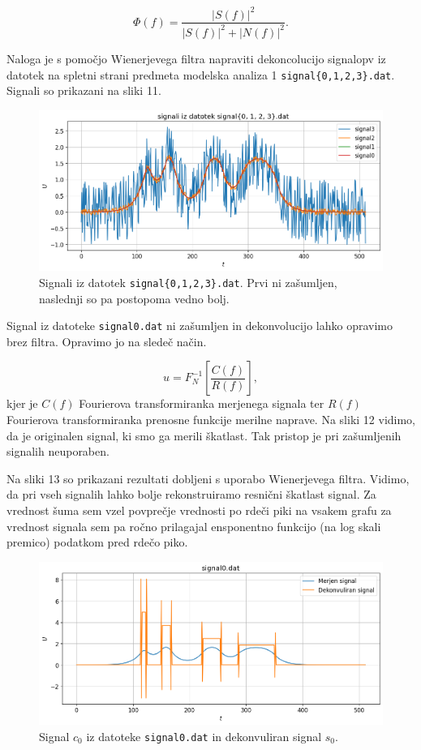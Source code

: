 \documentclass[slovene,11pt,a4paper]{article}
\begin{document}
\begin{equation}
\Phi (f) = \frac{|S(f)|^2}{|S(f)|^2+|N(f)|^2}.
\end{equation}

Naloga je s pomočjo Wienerjevega filtra napraviti dekoncolucijo signalopv iz datotek na spletni strani predmeta modelska analiza 1 \texttt{signal\{0,1,2,3\}.dat}. Signali so prikazani na sliki 11.

\begin{figure}[h!]
\centering
\includegraphics[width=12cm]{slika11.png}
\caption{Signali iz datotek \texttt{signal\{0,1,2,3\}.dat}. Prvi ni zašumljen, naslednji so pa postopoma vedno bolj.}
\end{figure}

Signal iz datoteke \texttt{signal0.dat} ni zašumljen in dekonvolucijo lahko opravimo brez filtra. Opravimo jo na sledeč način.

\begin{equation}
u = F_N^{-1} \left[ \frac{C(f)}{R(f)} \right],
\end{equation}
kjer je $C(f)$ Fourierova transformiranka merjenega signala ter $R(f)$ Fourierova transformiranka prenosne funkcije merilne naprave. Na sliki 12 vidimo, da je originalen signal, ki smo ga merili škatlast. Tak pristop je pri zašumljenih signalih neuporaben.

Na sliki 13 so prikazani rezultati dobljeni s uporabo Wienerjevega filtra. Vidimo, da pri vseh signalih lahko bolje rekonstruiramo resnični škatlast signal. Za vrednost šuma sem vzel povprečje vrednosti po rdeči piki na vsakem grafu za vrednost signala sem pa ročno prilagajal ensponentno funkcijo (na log skali premico) podatkom pred rdečo piko.

\newpage

\begin{figure}[h!]
\centering
\includegraphics[width=12cm]{slika12.png}
\caption{Signal $c_0 $ iz datoteke \texttt{signal0.dat} in dekonvuliran signal $s_0$.}
\end{figure}
\end{document}
